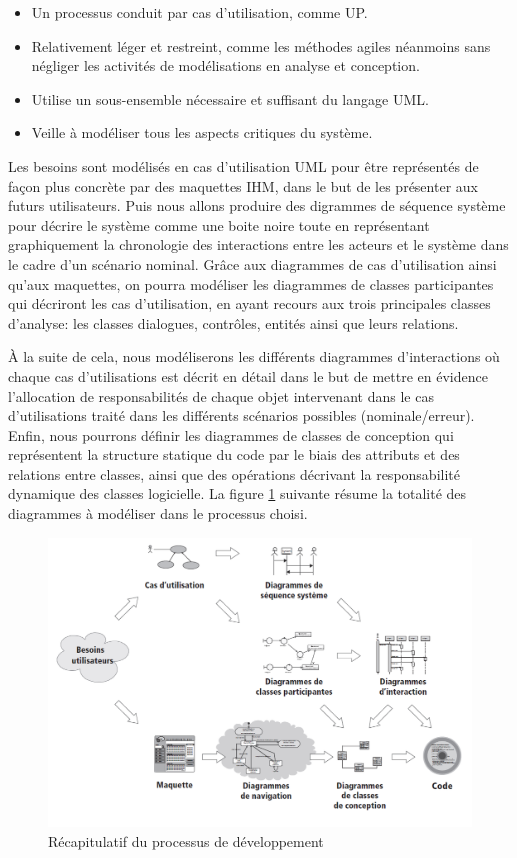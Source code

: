 \begin{itemize}
    \item [\textbullet] Un processus conduit par cas d’utilisation, comme UP.
    \item [\textbullet] Relativement léger et restreint, comme les méthodes
        agiles néanmoins sans négliger les activités de modélisations en analyse
        et conception.  
    \item [\textbullet] Utilise un sous-ensemble nécessaire et
    suffisant du langage UML.
    \item [\textbullet] Veille à modéliser tous les aspects critiques du système.
\end{itemize}
        
Les besoins sont modélisés en cas d’utilisation UML pour être représentés de
façon plus concrète par des maquettes IHM, dans le but de les présenter aux
futurs utilisateurs. Puis nous allons produire des digrammes de séquence système
pour décrire le système comme une boite noire toute en représentant
graphiquement la chronologie des interactions entre les acteurs et le système
dans le cadre d’un scénario nominal. Grâce aux diagrammes de cas d’utilisation
ainsi qu’aux maquettes, on pourra modéliser les diagrammes de classes
participantes qui décriront les cas d’utilisation, en ayant recours aux trois
principales classes d’analyse: les classes dialogues, contrôles, entités ainsi
que leurs relations.

À la suite de cela, nous modéliserons les différents diagrammes d’interactions
où chaque cas d’utilisations est décrit en détail dans le but de mettre en
évidence l’allocation de responsabilités de chaque objet intervenant dans le cas
d’utilisations traité dans les différents scénarios possibles
(nominale/erreur). Enfin, nous pourrons définir les diagrammes de classes de
conception qui représentent la structure statique du code par le biais des
attributs et des relations entre classes, ainsi que des opérations décrivant la
responsabilité dynamique des classes logicielle.  La figure \ref{fig1} suivante
résume la totalité des diagrammes à modéliser dans le processus choisi.

\begin{figure}[h!]
  \centering
  \includegraphics[width=12cm]{images/processus_dev.png}
  \vspace{-10pt}
  \caption{Récapitulatif du processus de développement \cite{5}}
  \label{fig1}
\end{figure}

